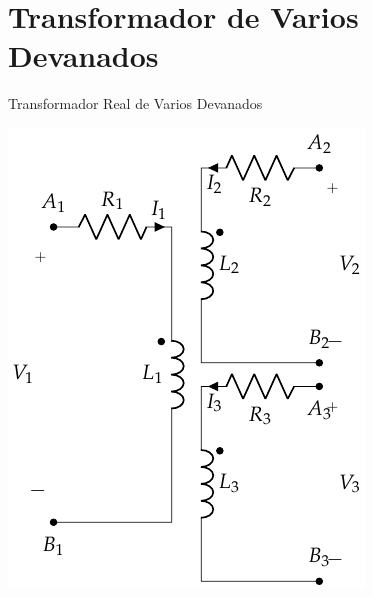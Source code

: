 \documentclass[xcolor={usenames,svgnames,dvipsnames}]{beamer}
\begin{document}
\section{Transformador de Varios Devanados}
\label{sec:orgb428816}
\begin{frame}[label={sec:org42eee8f}]{Transformador Real de Varios Devanados}
\begin{center}
\includegraphics[height=0.9\textheight]{../figs/TrafoVariosDevanados.pdf}
\end{center}
\end{frame}
\end{document}
